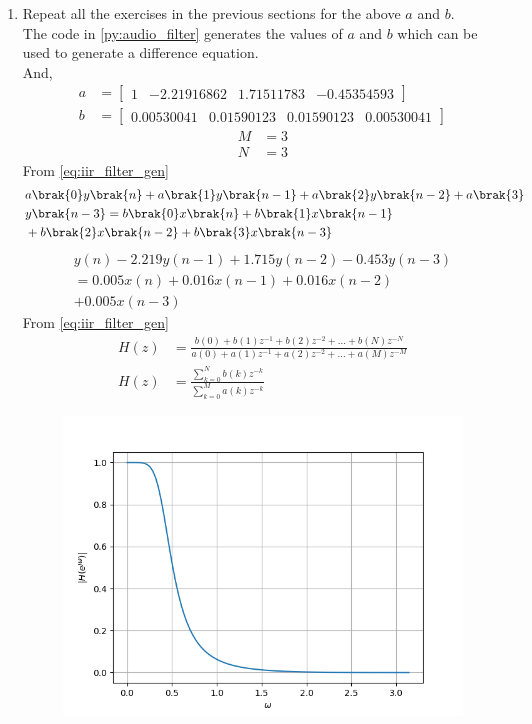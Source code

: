 \documentclass[journal,12pt,twocolumn]{IEEEtran}
\theoremstyle{remark}
\begin{document}
\begin{enumerate}[label=\thesection.\arabic*]
\item Repeat all the exercises in the previous sections for the above $a$ and $b$.\\
\solution The code in \ref{py:audio_filter} generates the values of $a$ and $b$  which can be used to generate a difference equation.\\
And,
\begin{align}
a &= \begin{bmatrix}
 1    &     -2.21916862 & 1.71511783& -0.45354593
\end{bmatrix}\nonumber\\
b &= \begin{bmatrix}
0.00530041& 0.01590123& 0.01590123 & 0.00530041
\end{bmatrix}\nonumber
\end{align}
\begin{align}
    M &= 3\\
    N&=3
\end{align}
From \ref{eq:iir_filter_gen} 
\begin{align}
    &a\brak{0}y\brak{n} + a\brak{1}y\brak{n-1}+a\brak{2}y\brak{n-2}+a\brak{3}\notag\\ \notag &y\brak{n-3} =   b\brak{0}x\brak{n} + b\brak{1}x\brak{n-1}\\ \notag &+b\brak{2}x\brak{n-2}+b\brak{3}x\brak{n-3} 
\end{align}
\begin{multline}
      y(n) - 2.219 y(n - 1) + 1.715 y(n - 2) - 0.453 y(n - 3) \nonumber \\
	= 0.005 x(n) + 0.016 x(n - 1) + 0.016 x(n - 2) \\\nonumber
        + 0.005 x(n - 3) 
\end{multline}
From \eqref{eq:iir_filter_gen} 
\begin{align}
    H(z) &= \frac{b(0) + b(1) z^{-1} + b(2) z^{-2} + \ldots + b(N) z^{-N}}{a(0) + a(1) z^{-1} + a(2) z^{-2} + \ldots + a(M) z^{-M}}\\
    H(z) &= \frac{\sum_{k = 0}^{N}b(k)z^{-k}}{\sum_{k = 0}^{M}a(k)z^{-k}} \label{eq:trans-func}
\end{align}
\begin{figure}[!ht]
    \centering
    \includegraphics[width=\columnwidth]{figs/Hz_custom.png}

\end{figure}
\end{enumerate}
\end{document}
